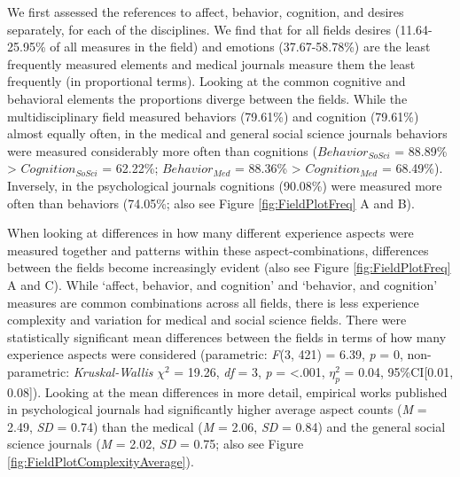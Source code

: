 We first assessed the references to affect, behavior, cognition, and
desires separately, for each of the disciplines. We find that for all
fields desires (11.64-25.95\% of all measures in the field) and emotions
(37.67-58.78\%) are the least frequently measured elements and medical
journals measure them the least frequently (in proportional terms).
Looking at the common cognitive and behavioral elements the proportions
diverge between the fields. While the multidisciplinary field measured
behaviors (79.61\%) and cognition (79.61\%) almost equally often, in the
medical and general social science journals behaviors were measured
considerably more often than cognitions (\(Behavior_{SoSci}\) = 88.89\%
\textgreater{} \(Cognition_{SoSci}\) = 62.22\%; \(Behavior_{Med}\) =
88.36\% \textgreater{} \(Cognition_{Med}\) = 68.49\%). Inversely, in the
psychological journals cognitions (90.08\%) were measured more often
than behaviors (74.05\%; also see Figure \ref{fig:FieldPlotFreq} A and
B).

When looking at differences in how many different experience aspects
were measured together and patterns within these aspect-combinations,
differences between the fields become increasingly evident (also see
Figure \ref{fig:FieldPlotFreq} A and C). While `affect, behavior, and
cognition' and `behavior, and cognition' measures are common
combinations across all fields, there is less experience complexity and
variation for medical and social science fields. There were
statistically significant mean differences between the fields in terms
of how many experience aspects were considered (parametric:
\textit{F}(3, 421) = 6.39, \textit{p} = 0, non-parametric:
\textit{Kruskal-Wallis} \(\chi^{2}\) = 19.26, \textit{df} = 3,
\textit{p} = \textless.001, \(\eta_{p}^{2}\) = 0.04, 95\%CI{[}0.01,
0.08{]}). Looking at the mean differences in more detail, empirical
works published in psychological journals had significantly higher
average aspect counts (\textit{M} = 2.49, \textit{SD} = 0.74) than the
medical (\textit{M} = 2.06, \textit{SD} = 0.84) and the general social
science journals (\textit{M} = 2.02, \textit{SD} = 0.75; also see Figure
\ref{fig:FieldPlotComplexityAverage}).

